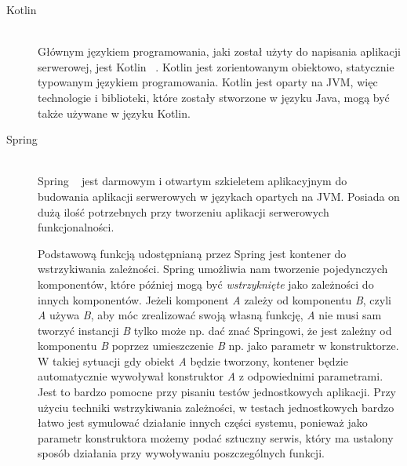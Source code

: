 \begin{description}

  \vspace{0.4cm}

  \item[Kotlin] \hfill \\ Głównym językiem programowania, jaki został użyty do napisania aplikacji serwerowej, jest Kotlin ~\cite{ref_kotlin_doc}. Kotlin jest zorientowanym obiektowo, statycznie typowanym językiem programowania. Kotlin jest oparty na JVM, więc technologie i biblioteki, które zostały stworzone w języku Java, mogą być także używane w języku Kotlin.

  \vspace{0.4cm}

  \item[Spring] \hfill \\ Spring ~\cite{ref_spring_doc} jest darmowym i otwartym szkieletem aplikacyjnym do budowania aplikacji serwerowych w językach opartych na JVM. Posiada on dużą ilość potrzebnych przy tworzeniu aplikacji serwerowych funkcjonalności.

    Podstawową funkcją udostępnianą przez Spring jest kontener do wstrzykiwania zależności. Spring umożliwia nam tworzenie pojedynczych komponentów, które później mogą być \emph{wstrzyknięte} jako zależności do innych komponentów. Jeżeli komponent \emph{A} zależy od komponentu \emph{B}, czyli \emph{A} używa \emph{B}, aby móc zrealizować swoją własną funkcję, \emph{A} nie musi sam tworzyć instancji \emph{B} tylko może np. dać znać Springowi, że jest zależny od komponentu \emph{B} poprzez umieszczenie \emph{B} np. jako parametr w konstruktorze. W takiej sytuacji gdy obiekt \emph{A} będzie tworzony, kontener będzie automatycznie wywoływał konstruktor \emph{A} z odpowiednimi parametrami. Jest to bardzo pomocne przy pisaniu testów jednostkowych aplikacji. Przy użyciu techniki wstrzykiwania zależności, w testach jednostkowych bardzo łatwo jest symulować działanie innych części systemu, ponieważ jako parametr konstruktora możemy podać sztuczny serwis, który ma ustalony sposób działania przy wywoływaniu poszczególnych funkcji.


\end{description}
